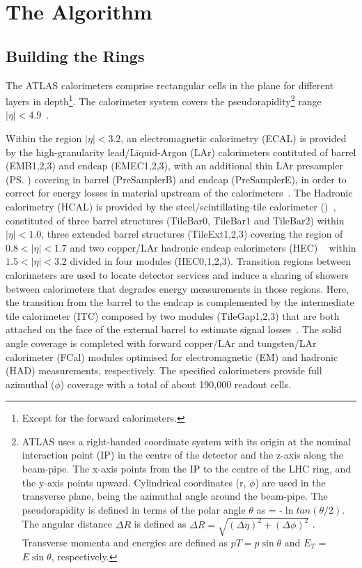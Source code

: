 \section{The \rnn{} Algorithm}%
\label{sec:neuralringer}


\subsection{Building the Rings}\label{ssec:rnn_for_online_and_eletrons}


The ATLAS calorimeters comprise rectangular cells in the
\etaphi plane for different layers in depth\footnote{Except for the forward calorimeters.}.
The calorimeter system covers the pseudorapidity\footnote{ATLAS uses a right-handed coordinate system with its origin at the nominal interaction point (IP) in the centre of the detector and the z-axis along the beam-pipe. The x-axis points from the IP to the centre of the LHC ring, and the y-axis points upward. Cylindrical coordinates (r, $\phi$) are used in the transverse plane, \phi being the azimuthal angle around the beam-pipe. The pseudorapidity is defined in terms of the polar angle $\theta$ as \eta = -$\ln{tan(\theta/2)}$. The angular distance $\Delta R$ is defined as $\Delta R = \sqrt{(\Delta\eta)^{2} + (\Delta\phi)^{2}}$ . Transverse momenta and energies are defined as $pT = p\sin\theta$ and $E_{T}$ = $E\sin\theta$, respectively.} range \(|\eta| < 4.9\)~\cite{PERF-2007-01}. 


Within the region $|\eta|< 3.2$, an electromagnetic calorimetry (ECAL) is provided by the high-granularity lead/Liquid-Argon (LAr) calorimeters contituted of barrel (EMB1,2,3) and endcap (EMEC1,2,3), with an additional thin LAr presampler (\ps) covering in barrel (PreSamplerB) and endcap (PreSamplerE), in order to correct for energy losses in material upstream of the calorimeters~\cite{LARG-2009-01,larg_tdr}. The Hadronic calorimetry (HCAL) is provided by the steel/scintillating-tile calorimeter (\tilecal)~\cite{TCAL-2017-01,tile_tdr}, constituted of three barrel structures (TileBar0, TileBar1 and TileBar2) within $|\eta| < 1.0$, three extended barrel structures (TileExt1,2,3) covering the region of $0.8<|\eta|< 1.7$ and two copper/LAr hadronic endcap calorimeters (HEC)
~\cite{cal_tdr} within $1.5<|\eta|< 3.2$ divided in four modules (HEC0,1,2,3). Transition regions between calorimeters are used to locate detector services and induce a sharing of showers between calorimeters that degrades energy measurements in those regions. Here, the transition from the barrel to the endcap is complemented by the intermediate tile calorimeter (ITC) composed by two modules (TileGap1,2,3) that are both attached on the face of the external barrel to estimate signal losses~\cite{cal_tdr}. The solid angle coverage is completed with forward
copper/LAr and tungsten/LAr calorimeter (FCal) modules optimised for electromagnetic (EM) and hadronic (HAD) measurements, respectively. The specified calorimeters
provide full azimuthal ($\phi$) coverage with a total of about 190,000 readout cells. 



